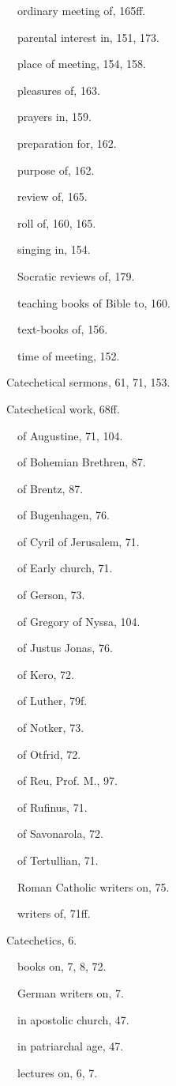 \begin{originalinhalt}
 ordinary meeting of, 165ff.

 parental interest in, 151, 173.

 place of meeting, 154, 158.

 pleasures of, 163.

 prayers in, 159.

 preparation for, 162.

 purpose of, 162.

 review of, 165.

 roll of, 160, 165.

 singing in, 154.

 Socratic reviews of, 179.

 teaching books of Bible to, 160.

 text-books of, 156.

 time of meeting, 152.

Catechetical sermons, 61, 71, 153.

Catechetical work, 68ff.

 of Augustine, 71, 104.

 of Bohemian Brethren, 87.

 of Brentz, 87.

 of Bugenhagen, 76.

 of Cyril of Jerusalem, 71.

 of Early church, 71.

 of Gerson, 73.

 of Gregory of Nyssa, 104.

 of Justus Jonas, 76.

 of Kero, 72.

 of Luther, 79f.

 of Notker, 73.

 of Otfrid, 72.

 of Reu, Prof. M., 97.

 of Rufinus, 71.

 of Savonarola, 72.

 of Tertullian, 71.

 Roman Catholic writers on, 75.

 writers of, 71ff.

Catechetics, 6.

 books on, 7, 8, 72.

 German writers on, 7.

 in apostolic church, 47.

 in patriarchal age, 47.

 lectures on, 6, 7.


\end{originalinhalt}

